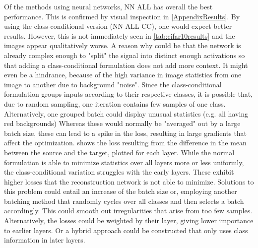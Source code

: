 Of the methods using neural networks, NN ALL has overall the best performance.
This is confirmed by visual inspection in \cref{AppendixResults}.
By using the class-conditional version (NN ALL CC), one would expect better results.
However, this is not immediately seen in \cref{tab:cifar10results} and the images appear qualitatively worse. 
A reason why could be that the network is already complex enough to "split" the signal into distinct enough activations so that adding
a class-conditional formulation does not add more context.
It might even be a hindrance, because of the high variance in image statistics
from one image to another due to background "noise".
Since the class-conditional formulation groups inputs according to their respective classes, 
it is possible that, due to random sampling, one iteration contains 
few samples of one class. Alternatively, one grouped batch could
display unusual statistics (e.g. all having red backgrounds)
Whereas these would normally be "averaged" out by a large batch size,
these can lead to a spike in the loss, 
resulting in large gradients that affect the optimization.
 shows the loss resulting from the difference in the mean
between the source and the target, plotted for each layer.
While the normal formulation is able to minimize statistics over all layers more or less uniformly,
the class-conditional variation struggles with the early layers.
These exhibit higher losses that the reconstruction network is not able to minimize.
Solutions to this problem could entail an increase of the batch size
or, employing another batching method that randomly cycles over all classes
and then selects a batch accordingly. 
This could smooth out irregularities that arise from too few samples.
Alternatively, the losses could be weighted by their layer, giving lower importance to earlier layers. 
Or a hybrid approach could be constructed that only uses class information in later layers.

